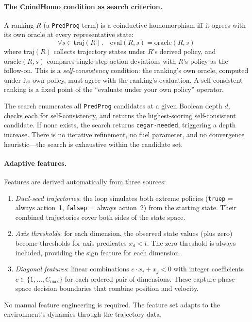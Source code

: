 \documentclass[9pt,a4paper]{article}
\theoremstyle{plain}
\theoremstyle{definition}
\theoremstyle{remark}
\begin{document}
\paragraph{The CoindHomo condition as search criterion.}
A ranking $R$ (a \texttt{PredProg} term) is a coinductive homomorphism iff it agrees with its own oracle at every representative state:
\[
  \forall s \in \mathrm{traj}(R).\quad \mathrm{eval}(R, s) = \mathrm{oracle}(R, s)
\]
where $\mathrm{traj}(R)$ collects trajectory states under $R$'s derived policy, and $\mathrm{oracle}(R, s)$ compares single-step action deviations with $R$'s policy as the follow-on.  This is a \emph{self-consistency} condition: the ranking's own oracle, computed under its own policy, must agree with the ranking's evaluation.  A self-consistent ranking is a fixed point of the ``evaluate under your own policy'' operator.

The search enumerates all \texttt{PredProg} candidates at a given Boolean depth $d$, checks each for self-consistency, and returns the highest-scoring self-consistent candidate.  If none exists, the search returns \texttt{cegar-needed}, triggering a depth increase.  There is no iterative refinement, no fuel parameter, and no convergence heuristic---the search is exhaustive within the candidate set.

\paragraph{Adaptive features.}
Features are derived automatically from three sources:
\begin{enumerate}
\item \emph{Dual-seed trajectories}: the loop simulates both extreme policies (\texttt{truep} = always action~1, \texttt{falsep} = always action~2) from the starting state.  Their combined trajectories cover both sides of the state space.
\item \emph{Axis thresholds}: for each dimension, the observed state values (plus zero) become thresholds for axis predicates $x_d < t$.  The zero threshold is always included, providing the sign feature for each dimension.
\item \emph{Diagonal features}: linear combinations $c \cdot x_i + x_j < 0$ with integer coefficients $c \in \{1, \ldots, C_{\max}\}$ for each ordered pair of dimensions.  These capture phase-space decision boundaries that combine position and velocity.
\end{enumerate}
No manual feature engineering is required.  The feature set adapts to the environment's dynamics through the trajectory data.
\end{document}

